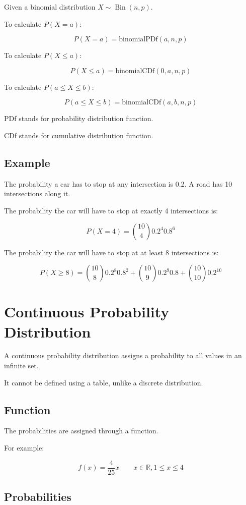 \documentclass[a4paper,11pt]{article}
\DeclareMathOperator\Bin{Bin}
\begin{document}
Given a binomial distribution $X \sim \Bin(n, p)$.

To calculate $P(X = a)$:

$$
P(X = a) = \text{binomialPDf}(a, n, p)
$$

To calculate $P(X \leq a)$:

$$
P(X \leq a) = \text{binomialCDf}(0, a, n, p)
$$

To calculate $P(a \leq X \leq b)$:

$$
P(a \leq X \leq b) = \text{binomialCDf}(a, b, n, p)
$$

PDf stands for probability distribution function.

CDf stands for cumulative distribution function.


\subsection{Example}

The probability a car has to stop at any intersection is 0.2. A road has 10
intersections along it.

The probability the car will have to stop at exactly 4 intersections is:

$$
P(X = 4) = \binom{10}{4} 0.2^4 0.8^6
$$

The probability the car will have to stop at at least 8 intersections is:

$$
P(X \geq 8) = \binom{10}{8} 0.2^8 0.8^2 + \binom{10}{9} 0.2^9 0.8 + \binom{10}{10} 0.2^{10}
$$



\section{Continuous Probability Distribution}

A continuous probability distribution assigns a probability to all values in an
infinite set.

It cannot be defined using a table, unlike a discrete distribution.


\subsection{Function}

The probabilities are assigned through a function.

For example:

$$
f(x) = \frac{4}{25} x \qquad x \in \mathbb{R}, 1 \leq x \leq 4
$$


\subsection{Probabilities}
\end{document}
